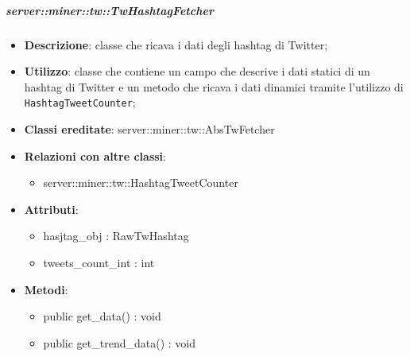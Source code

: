 	\subparagraph{server::miner::tw::TwHashtagFetcher} %
		\label{subp:server_miner_tw_TwHashtagFetcher}
			\begin{itemize}
				\item \textbf{Descrizione}: classe che ricava i dati degli hashtag di Twitter;
				\item \textbf{Utilizzo}: classe che contiene un campo che descrive i dati statici di un hashtag di Twitter e un metodo che ricava i dati dinamici tramite l'utilizzo di \texttt{HashtagTweetCounter};
				\item \textbf{Classi ereditate}: server::miner::tw::AbsTwFetcher
				\item \textbf{Relazioni con altre classi}:
					\begin{itemize}
						\item server::miner::tw::HashtagTweetCounter
					\end{itemize}
				\item \textbf{Attributi}:    
					\begin{itemize}
						\item hasjtag\_obj : RawTwHashtag
						\item tweets\_count\_int : int
					\end{itemize}
				\item \textbf{Metodi}:  
					\begin{itemize}
						\item public get\_data() : void
						\item public get\_trend\_data() : void
					\end{itemize}
			\end{itemize}

